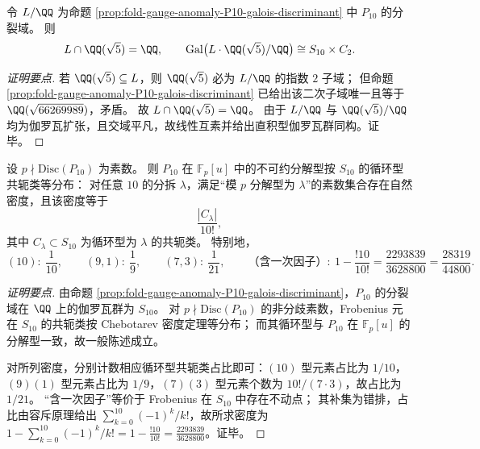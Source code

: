 

\begin{corollary}[唯一二次子域与黄金二次域的线性互素性]\label{cor:fold-gauge-anomaly-P10-disjoint-sqrt5}
令 \(L/\QQ\) 为命题 \ref{prop:fold-gauge-anomaly-P10-galois-discriminant} 中 \(P_{10}\) 的分裂域。
则
\[
L\cap \QQ(\sqrt5)=\QQ,
\qquad
\mathrm{Gal}\bigl(L\cdot \QQ(\sqrt5)/\QQ\bigr)\cong S_{10}\times C_2.
\]
\end{corollary}
\begin{proof}[证明要点]
若 \(\QQ(\sqrt5)\subseteq L\)，则 \(\QQ(\sqrt5)\) 必为 \(L/\QQ\) 的指数 \(2\) 子域；
但命题 \ref{prop:fold-gauge-anomaly-P10-galois-discriminant} 已给出该二次子域唯一且等于 \(\QQ(\sqrt{66269989})\)，矛盾。
故 \(L\cap \QQ(\sqrt5)=\QQ\)。
由于 \(L/\QQ\) 与 \(\QQ(\sqrt5)/\QQ\) 均为伽罗瓦扩张，且交域平凡，故线性互素并给出直积型伽罗瓦群同构。证毕。
\end{proof}

\begin{corollary}\label{cor:fold-gauge-anomaly-P10-modp-splitting-densities}
设 \(p\nmid \mathrm{Disc}(P_{10})\) 为素数。
则 \(P_{10}\) 在 \(\mathbb F_p[u]\) 中的不可约分解型按 \(S_{10}\) 的循环型共轭类等分布：
对任意 \(10\) 的分拆 \(\lambda\)，满足“模 \(p\) 分解型为 \(\lambda\)”的素数集合存在自然密度，且该密度等于
\[
\frac{|C_{\lambda}|}{10!},
\]
其中 \(C_{\lambda}\subset S_{10}\) 为循环型为 \(\lambda\) 的共轭类。
特别地，
\[
(10):\ \frac1{10},\qquad (9,1):\ \frac1{9},\qquad (7,3):\ \frac1{21},\qquad
\text{（含一次因子）}:\ 1-\frac{!10}{10!}=\frac{2293839}{3628800}=\frac{28319}{44800}.
\]
\end{corollary}
\begin{proof}[证明要点]
由命题 \ref{prop:fold-gauge-anomaly-P10-galois-discriminant}，\(P_{10}\) 的分裂域在 \(\QQ\) 上的伽罗瓦群为 \(S_{10}\)。
对 \(p\nmid \mathrm{Disc}(P_{10})\) 的非分歧素数，Frobenius 元在 \(S_{10}\) 的共轭类按 Chebotarev 密度定理等分布；
而其循环型与 \(P_{10}\) 在 \(\mathbb F_p[u]\) 的分解型一致，故一般陈述成立。
\par
对所列密度，分别计数相应循环型共轭类占比即可：\((10)\) 型元素占比为 \(1/10\)，\((9)(1)\) 型元素占比为 \(1/9\)，\((7)(3)\) 型元素个数为 \(10!/(7\cdot 3)\)，故占比为 \(1/21\)。
“含一次因子”等价于 Frobenius 在 \(S_{10}\) 中存在不动点；
其补集为错排，占比由容斥原理给出 \(\sum_{k=0}^{10}(-1)^k/k!\)，故所求密度为
\(
1-\sum_{k=0}^{10}(-1)^k/k!=1-\frac{!10}{10!}=\frac{2293839}{3628800}
\)。证毕。
\end{proof}

